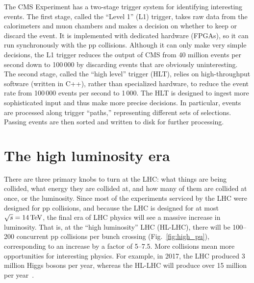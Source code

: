 The CMS Experiment has a two-stage trigger system for identifying interesting events. 
The first stage, called the ``Level 1'' (L1) trigger, takes raw data from the calorimeters and muon chambers and makes a decision on whether to keep or discard the event. 
It is implemented with dedicated hardware (FPGAs), so it can run synchronously with the pp collisions. 
Although it can only make very simple decisions, the L1 trigger reduces the output of CMS from 40 million events per second down to 100\,000 by discarding events that are obviously uninteresting. 
The second stage, called the ``high level'' trigger (HLT), relies on high-throughput software (written in C++), rather than specialized hardware, to reduce the event rate from 100\,000 events per second to 1\,000. 
The HLT is designed to ingest more sophisticated input and thus make more precise decisions. 
In particular, events are processed along trigger ``paths,'' representing different sets of selections. 
Passing events are then sorted and written to disk for further processing. 

\section{The high luminosity era}
There are three primary knobs to turn at the LHC: what things are being collided, what energy they are collided at, and how many of them are collided at once, or the luminosity. 
Since most of the experiments serviced by the LHC were designed for pp collisions, and because the LHC is designed for at most $\sqrt{s} = 14\,\text{Te\hspace{-.08em}V}$, the final era of LHC physics will see a massive increase in luminosity. 
That is, at the ``high luminosity'' LHC (HL-LHC), there will be 100--200 concurrent pp collisions per bunch crossing (Fig.~\ref{fig:high_pu}), corresponding to an increase by a factor of 5--7.5.
More collisions mean more opportunities for interesting physics. 
For example, in 2017, the LHC produced 3 million Higgs bosons per year, whereas the HL-LHC will produce over 15 million per year~\cite{HighLumiWebFacts}. 

